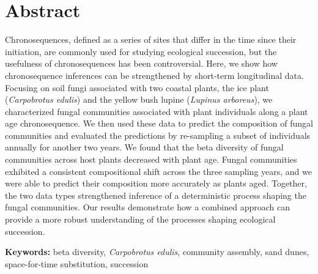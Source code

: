 \section{Abstract}
Chronosequences, defined as a series of sites that differ in the time since their initiation, are commonly used for studying ecological succession, but the usefulness of chronosequences has been controversial. Here, we show how chronosequence inferences can be strengthened by short-term longitudinal data.
Focusing on soil fungi associated with two coastal plants, the ice plant (\textit{Carpobrotus edulis}) and the yellow bush lupine (\textit{Lupinus arboreus}), we characterized fungal communities associated with plant individuals along a plant age chronosequence. 
We then used these data to predict the composition of fungal communities and evaluated the predictions by re-sampling a subset of individuals annually for another two years.
We found that the beta diversity of fungal communities across host plants decreased with plant age. Fungal communities exhibited a consistent compositional shift across the three sampling years, and we were able to predict their composition more accurately as plants aged. Together, the two data types strengthened inference of a deterministic process shaping the fungal communities. Our results demonstrate how a combined approach can provide a more robust understanding of the processes shaping ecological succession.
\medskip


\noindent \textbf{Keywords:} beta diversity, \textit{Carpobrotus edulis}, community assembly, sand dunes, space-for-time substitution, succession



